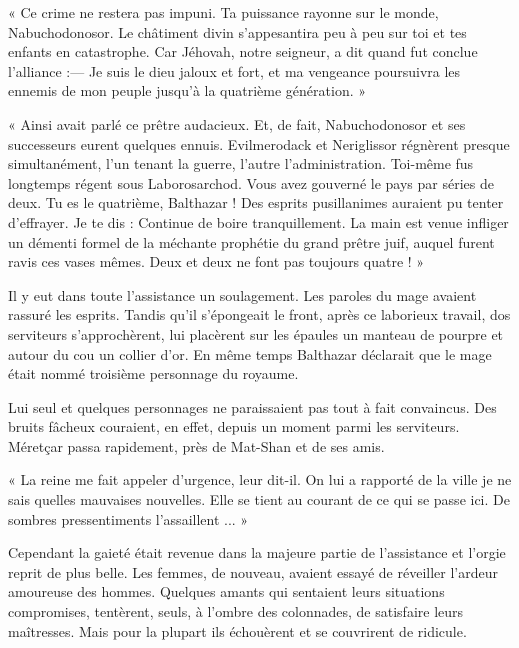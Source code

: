 \documentclass[a4paper, 11pt, oneside, polutonikogreek, french]{article}
\begin{document}
« Ce crime ne restera pas impuni. Ta puissance rayonne sur le monde, Nabuchodonosor. Le châtiment divin s'appesantira peu à peu sur toi et tes enfants en catastrophe. Car Jéhovah, notre seigneur, a dit quand fut conclue l'alliance :--- Je suis le dieu jaloux et fort, et ma vengeance poursuivra les ennemis de mon peuple jusqu'à la quatrième génération. »

« Ainsi avait parlé ce prêtre audacieux. Et, de fait, Nabuchodonosor et ses successeurs eurent quelques ennuis. Evilmerodack et Neriglissor régnèrent presque simultanément, l'un tenant la guerre, l'autre l'administration. Toi-même fus longtemps régent sous Laborosarchod. Vous avez gouverné le pays par séries de deux. Tu es le quatrième, Balthazar ! Des esprits pusillanimes auraient pu tenter d'effrayer. Je te dis : Continue de boire tranquillement. La main est venue infliger un démenti formel de la méchante prophétie du grand prêtre juif, auquel furent ravis ces vases mêmes. Deux et deux ne font pas toujours quatre ! »

Il y eut dans toute l'assistance un soulagement. Les paroles du mage avaient rassuré les esprits. Tandis qu'il s'épongeait le front, après ce laborieux travail, dos serviteurs s'approchèrent, lui placèrent sur les épaules un manteau de pourpre et autour du cou un collier d'or. En même temps Balthazar déclarait que le mage était nommé troisième personnage du royaume.

\bigskip
\centerline{\EightStarTaper}
\centerline{\EightStarTaper\EightStarTaper}
\bigskip

Lui seul et quelques personnages ne paraissaient pas tout à fait convaincus. Des bruits fâcheux couraient, en effet, depuis un moment parmi les serviteurs. Méretçar passa rapidement, près de Mat-Shan et de ses amis.

« La reine me fait appeler d'urgence, leur dit-il. On lui a rapporté de la ville je ne sais quelles mauvaises nouvelles. Elle se tient au courant de ce qui se passe ici. De sombres pressentiments l'assaillent ... »

Cependant la gaieté était revenue dans la majeure partie de l'assistance et l'orgie reprit de plus belle. Les femmes, de nouveau, avaient essayé de réveiller l'ardeur amoureuse des hommes. Quelques amants qui sentaient leurs situations compromises, tentèrent, seuls, à l'ombre des colonnades, de satisfaire leurs maîtresses. Mais pour la plupart ils échouèrent et se couvrirent de ridicule.

\bigskip
\centerline{\EightStarTaper}
\centerline{\EightStarTaper\EightStarTaper}
\bigskip
\end{document}
